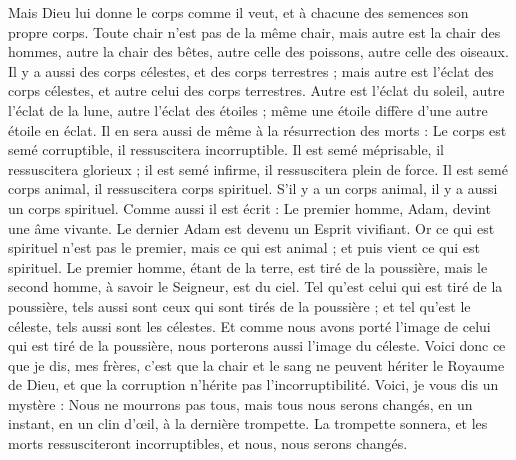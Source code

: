 \begin{multicols}{2}
Mais Dieu lui donne le corps comme il veut, et à chacune des semences son propre corps.
Toute chair n'est pas de la même chair, mais autre est la chair des hommes, autre la chair des bêtes, autre celle des poissons, autre celle des oiseaux.
Il y a aussi des corps célestes, et des corps terrestres ; mais autre est l’éclat des corps célestes, et autre celui des corps terrestres.
Autre est l’éclat du soleil, autre l’éclat de la lune, autre l’éclat des étoiles ; même une étoile diffère d'une autre étoile en éclat.
Il en sera aussi de même à la résurrection des morts : Le corps est semé corruptible, il ressuscitera incorruptible.
Il est semé méprisable, il ressuscitera glorieux ; il est semé infirme, il ressuscitera plein de force.
Il est semé corps animal, il ressuscitera corps spirituel. S’il y a un corps animal, il y a aussi un corps spirituel.
Comme aussi il est écrit : Le premier homme, Adam, devint une âme vivante. Le dernier Adam est devenu un Esprit vivifiant.
Or ce qui est spirituel n'est pas le premier, mais ce qui est animal ; et puis vient ce qui est spirituel.
Le premier homme, étant de la terre, est tiré de la poussière, mais le second homme, à savoir le Seigneur, est du ciel.
Tel qu'est celui qui est tiré de la poussière, tels aussi sont ceux qui sont tirés de la poussière ; et tel qu'est le céleste, tels aussi sont les célestes.
Et comme nous avons porté l'image de celui qui est tiré de la poussière, nous porterons aussi l'image du céleste.
Voici donc ce que je dis, mes frères, c'est que la chair et le sang ne peuvent hériter le Royaume de Dieu, et que la corruption n'hérite pas l'incorruptibilité.
Voici, je vous dis un mystère : Nous ne mourrons pas tous, mais tous nous serons changés,
en un instant, en un clin d’œil, à la dernière trompette. La trompette sonnera, et les morts ressusciteront incorruptibles, et nous, nous serons changés.

\end{multicols}
